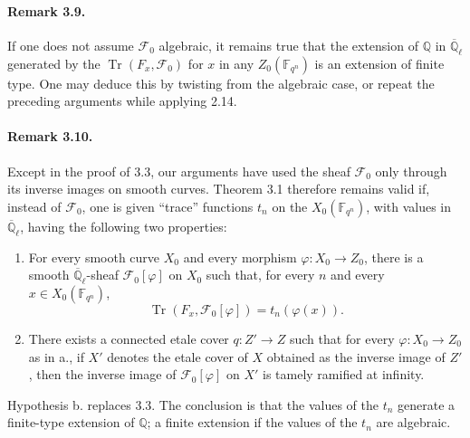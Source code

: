 \documentclass[10pt]{article}
\newcommand{\F}{\mathbb{F}}
\newcommand{\Q}{\mathbb{Q}}
\newcommand{\Ql}{\overline{\mathbb Q}_{\ell}}
\newcommand{\Tr}{\operatorname{Tr}}
\begin{document}
\paragraph{Remark 3.9.}
If one does not assume $\mathcal F_0$ algebraic, it remains true that the extension of $\Q$ in $\Ql$ generated by the $\Tr(F_x,\mathcal F_0)$ for $x$ in any $Z_0(\F_{q^n})$ is an extension of finite type.
One may deduce this by twisting from the algebraic case, or repeat the preceding arguments while applying 2.14.

\paragraph{Remark 3.10.}
Except in the proof of 3.3, our arguments have used the sheaf $\mathcal F_0$ only through its inverse images on smooth curves.
Theorem 3.1 therefore remains valid if, instead of $\mathcal F_0$, one is given ``trace'' functions $t_n$ on the $X_0(\F_{q^n})$, with values in $\Ql$, having the following two properties:
\begin{enumerate}[label=\alph*.]
\item For every smooth curve $X_0$ and every morphism $\varphi:X_0\to Z_0$, there is a smooth $\Ql$-sheaf $\mathcal F_0[\varphi]$ on $X_0$ such that, for every $n$ and every $x\in X_0(\F_{q^n})$,
\[
 \Tr(F_x,\mathcal F_0[\varphi])=t_n(\varphi(x)).
\]
\item There exists a connected etale cover $q:Z'\to Z$ such that for every $\varphi:X_0\to Z_0$ as in a., if $X'$ denotes the etale cover of $X$ obtained as the inverse image of $Z'$, then the inverse image of $\mathcal F_0[\varphi]$ on $X'$ is tamely ramified at infinity.
\end{enumerate}
Hypothesis b. replaces 3.3.
The conclusion is that the values of the $t_n$ generate a finite-type extension of $\Q$; a finite extension if the values of the $t_n$ are algebraic.
\end{document}
